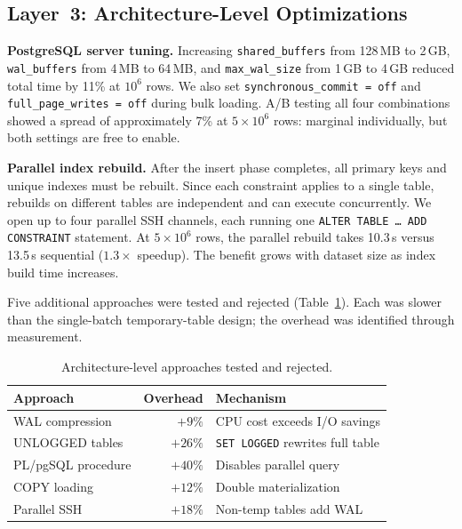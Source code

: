 \documentclass[journal]{IEEEtran}
\begin{document}
\subsection{Layer~3: Architecture-Level Optimizations}
\label{sec:layer3}

\textbf{PostgreSQL server tuning.}
Increasing \texttt{shared\_buffers} from 128\,MB to 2\,GB, \texttt{wal\_buffers} from 4\,MB to 64\,MB, and \texttt{max\_wal\_size} from 1\,GB to 4\,GB reduced total time by 11\% at $10^6$ rows.
We also set \texttt{synchronous\_commit\,=\,off} and \texttt{full\_page\_writes\,=\,off} during bulk loading.
A/B testing all four combinations showed a spread of approximately 7\% at $5 \times 10^6$ rows: marginal individually, but both settings are free to enable.

\textbf{Parallel index rebuild.}
After the insert phase completes, all primary keys and unique indexes must be rebuilt.
Since each constraint applies to a single table, rebuilds on different tables are independent and can execute concurrently.
We open up to four parallel SSH channels, each running one \texttt{ALTER TABLE \ldots\ ADD CONSTRAINT} statement.
At $5 \times 10^6$ rows, the parallel rebuild takes 10.3\,s versus 13.5\,s sequential ($1.3\times$ speedup).
The benefit grows with dataset size as index build time increases.

Five additional approaches were tested and rejected (Table~\ref{tab:rejected}).
Each was slower than the single-batch temporary-table design; the overhead was identified through measurement.

\begin{table}[!ht]
\centering
\caption{Architecture-level approaches tested and rejected.}
\label{tab:rejected}
\begin{tabular}{lrl}
\toprule
\textbf{Approach} & \textbf{Overhead} & \textbf{Mechanism} \\
\midrule
WAL compression     & $+9\%$  & CPU cost exceeds I/O savings \\
UNLOGGED tables     & $+26\%$ & \texttt{SET LOGGED} rewrites full table \\
PL/pgSQL procedure  & $+40\%$ & Disables parallel query \\
COPY loading        & $+12\%$ & Double materialization \\
Parallel SSH        & $+18\%$ & Non-temp tables add WAL \\
\bottomrule
\end{tabular}
\end{table}
\end{document}
